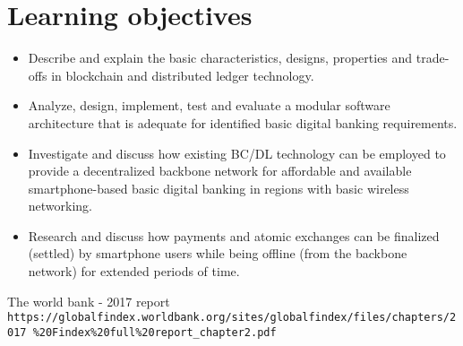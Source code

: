 \documentclass[12pt]{article}
\begin{document}
\section{Learning objectives}
\begin{itemize}
    \item Describe and explain the basic characteristics, designs, properties and trade-offs in blockchain and distributed ledger technology.
    \item Analyze, design, implement, test and evaluate a modular software architecture that is adequate for identified basic digital banking requirements.
    \item Investigate and discuss how existing BC/DL technology can be employed to provide a decentralized backbone network for affordable and available smartphone-based basic digital banking in regions with basic wireless networking.
    \item Research and discuss how payments and atomic exchanges can be finalized (settled) by smartphone users while being offline (from the backbone network) for extended periods of time.
\end{itemize}

\begin{thebibliography}{1}
    The world bank - 2017 report\\
    \texttt{https://globalfindex.worldbank.org/sites/globalfindex/files/chapters/2017
    \%20Findex\%20full\%20report\_chapter2.pdf}
\end{thebibliography}
\end{document}
